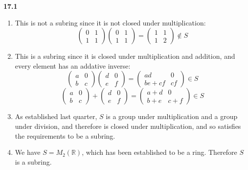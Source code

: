 \documentclass[12pt]{article}
\newenvironment{ques}{\vspace{2 ex}}{\vspace{2 ex}}
\theoremstyle{definition}
\begin{document}
\begin{ques}
	\textbf{17.1}
	\begin{enumerate}
		\item
		This is not a subring since it is not closed under multiplication:
		$$\left(\begin{matrix} 0 & 1 \\ 1 & 1
		\end{matrix}\right)\left(\begin{matrix} 0 & 1 \\ 1 & 1
		\end{matrix}\right) = \left(\begin{matrix} 1 & 1 \\ 1 & 2
		\end{matrix}\right) \notin S $$
		\item
		This is a subring since it is closed under multiplication and
		addition, and every element has an addative inverse:
		$$\left(\begin{matrix} a & 0 \\ b & c
		\end{matrix}\right)\left(\begin{matrix} d & 0 \\ e & f
		\end{matrix}\right) = \left(\begin{matrix} ad & 0 \\ be + cf & cf
		\end{matrix}\right) \in S $$
		$$\left(\begin{matrix} a & 0 \\ b & c
		\end{matrix}\right) + \left(\begin{matrix} d & 0 \\ e & f
		\end{matrix}\right) = \left(\begin{matrix} a + d & 0 \\ b + e & c + f
		\end{matrix}\right) \in S $$
		\item
		As established last quarter, $S$ is a group under
		multiplication and a group under division, and therefore is
		closed under multiplication, and so satisfies the requirements
		to be a subring.
		\item
		We have $S = M_2(\mathbb R)$, which has been established to be
		a ring. Therefore $S$ is a subring.
	\end{enumerate}
\end{ques}
\end{document}
